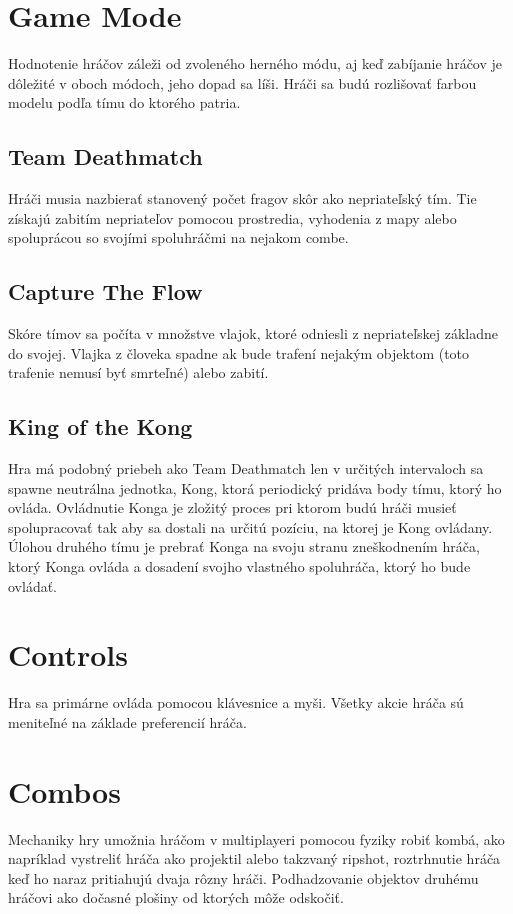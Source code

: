 \documentclass[a4paper]{report}
\begin{document}
\section{Game Mode}
Hodnotenie hráčov záleži od zvoleného herného módu, aj keď zabíjanie hráčov je dôležité v oboch módoch, jeho dopad sa líši. Hráči sa budú rozlišovať farbou modelu podľa tímu do ktorého patria.
\subsection{Team Deathmatch}
Hráči musia nazbierať stanovený počet fragov skôr ako nepriateľský tím. Tie získajú zabitím nepriateľov pomocou prostredia, vyhodenia z mapy alebo spoluprácou so svojími spoluhráčmi na nejakom combe.

\subsection{Capture The Flow}
Skóre tímov sa počíta v množstve vlajok, ktoré odniesli z nepriateľskej základne do svojej. Vlajka z človeka spadne ak bude trafení nejakým objektom (toto trafenie nemusí byť smrteľné) alebo zabití.

\subsection{King of the Kong}
Hra má podobný priebeh ako Team Deathmatch len v určitých intervaloch sa spawne neutrálna jednotka, Kong, ktorá periodický pridáva body tímu, ktorý ho ovláda. Ovládnutie Konga je zložitý proces pri ktorom budú hráči musieť spolupracovať tak aby sa dostali na určitú pozíciu, na ktorej je Kong ovládany. Úlohou druhého tímu je prebrať Konga na svoju stranu zneškodnením hráča, ktorý Konga ovláda a dosadení svojho vlastného spoluhráča, ktorý ho bude ovládať.
 
\section{Controls}
Hra sa primárne ovláda pomocou klávesnice a myši. Všetky akcie hráča sú meniteľné na základe preferencií hráča. 

\section{Combos}
Mechaniky hry umožnia hráčom v multiplayeri pomocou fyziky robiť kombá, ako napríklad vystreliť hráča ako projektil alebo takzvaný ripshot, roztrhnutie hráča keď ho naraz pritiahujú dvaja rôzny hráči. Podhadzovanie objektov druhému hráčovi ako dočasné plošiny od ktorých môže odskočiť. 
\end{document}
